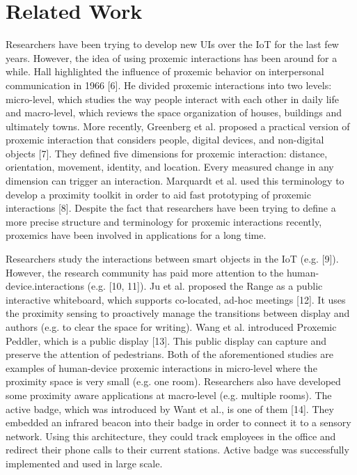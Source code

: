 \documentclass[runningheads,a4paper]{llncs}
\begin{document}
\section{Related Work}
Researchers have been trying to develop new UIs over the IoT for the last few
years. However, the idea of using proxemic interactions has been around for
a while. Hall highlighted the influence of proxemic behavior on interpersonal
communication in 1966 [6]. He divided proxemic interactions into two levels:
micro-level, which studies the way people interact with each other in daily life
and macro-level, which reviews the space organization of houses, buildings and
ultimately towns. More recently, Greenberg et al. proposed a practical version
of proxemic interaction that considers people, digital devices, and non-digital
objects [7]. They defined five dimensions for proxemic interaction: distance, orientation, movement, identity, and location. Every measured change in any dimension can trigger an interaction. Marquardt et al. used this terminology to
develop a proximity toolkit in order to aid fast prototyping of proxemic interactions [8]. Despite the fact that researchers have been trying to define a more
precise structure and terminology for proxemic interactions recently, proxemics
have been involved in applications for a long time.



Researchers study the interactions between smart objects in the IoT (e.g. [9]). However, the research community has paid more attention to the human-device.interactions (e.g. [10, 11]). Ju et al. proposed the Range as a public interactive
whiteboard, which supports co-located, ad-hoc meetings [12]. It uses the proximity sensing to proactively manage the transitions between display and authors
(e.g. to clear the space for writing). Wang et al. introduced Proxemic Peddler,
which is a public display [13]. This public display can capture and preserve the
attention of pedestrians. Both of the aforementioned studies are examples of
human-device proxemic interactions in micro-level where the proximity space
is very small (e.g. one room). Researchers also have developed some proximity
aware applications at macro-level (e.g. multiple rooms). The active badge, which
was introduced by Want et al., is one of them [14]. They embedded an infrared
beacon into their badge in order to connect it to a sensory network. Using this
architecture, they could track employees in the office and redirect their phone
calls to their current stations. Active badge was successfully implemented and
used in large scale.
\end{document}
